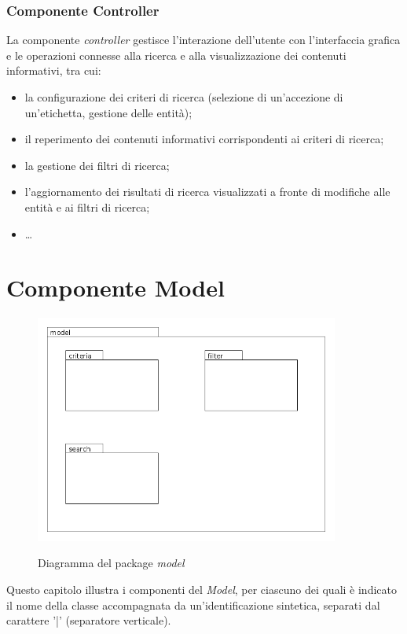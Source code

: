 \documentclass[10pt,a4paper,headinclude,footinclude,hidelinks]{scrreprt} %
\begin{document}
	\subsection{Componente Controller}
	\label{sec:stage:design:mvc:controller}
	La componente \textit{controller} gestisce l'interazione dell'utente con l'interfaccia grafica e le operazioni connesse alla ricerca e alla visualizzazione dei contenuti informativi, tra cui:
	\begin{itemize}
	\item la configurazione dei criteri di ricerca (selezione di un'accezione di un'etichetta, gestione delle entità);
	\item il reperimento dei contenuti informativi corrispondenti ai criteri di ricerca;
	\item la gestione dei filtri di ricerca;
	\item l'aggiornamento dei risultati di ricerca visualizzati a fronte di modifiche alle entità e ai filtri di ricerca;
	\item \ldots
	\end{itemize}

	\chapter{Componente Model}
	\label{ch:stage:design:model}

	\begin{figure}[ht]
		\begin{center}
	    	\includegraphics[width=10cm]{package/model.png}
			\label{gfx:package:model}
			\caption{Diagramma del package \textit{model}}
		\end{center}
	\end{figure}

	Questo capitolo illustra i componenti del \textit{Model}, per ciascuno dei quali è indicato il nome della classe accompagnata da un'identificazione sintetica, separati dal carattere '|' (separatore verticale).
\end{document}
